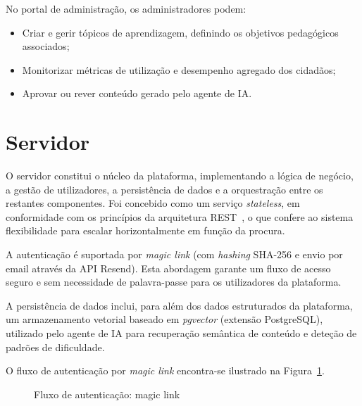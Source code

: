 No portal de administração, os administradores podem:
\begin{itemize}
  \item Criar e gerir tópicos de aprendizagem, definindo os objetivos pedagógicos associados;
  \item Monitorizar métricas de utilização e desempenho agregado dos cidadãos;
  \item Aprovar ou rever conteúdo gerado pelo agente de IA.
\end{itemize}

\section{Servidor}
\label{sec:servidor}

O servidor constitui o núcleo da plataforma, implementando a lógica de negócio, a gestão de utilizadores, a persistência de dados e a orquestração entre os restantes componentes. Foi concebido como um serviço \textit{stateless}, em conformidade com os princípios da arquitetura REST~\cite{fielding2000rest}, o que confere ao sistema flexibilidade para escalar horizontalmente em função da procura.

A autenticação é suportada por \textit{magic link} (com \textit{hashing} SHA-256 e envio por email através da API Resend). Esta abordagem garante um fluxo de acesso seguro e sem necessidade de palavra-passe para os utilizadores da plataforma.

A persistência de dados inclui, para além dos dados estruturados da plataforma, um armazenamento vetorial baseado em \textit{pgvector} (extensão PostgreSQL), utilizado pelo agente de IA para recuperação semântica de conteúdo e deteção de padrões de dificuldade.

O fluxo de autenticação por \textit{magic link} encontra-se ilustrado na Figura~\ref{fig:auth_flow}.

\begin{figure}[htbp]
  \centering
  \caption{Fluxo de autenticação: magic link}
  \label{fig:auth_flow}
\end{figure}

